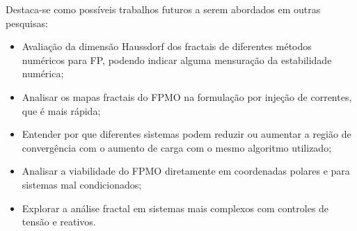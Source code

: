 Destaca-se como possíveis trabalhos futuros a serem abordados em outras pesquisas:\vspace{-1em}
\begin{itemize}
    \item Avaliação da dimensão Haussdorf dos fractais de diferentes métodos numéricos para \ac{FP}, podendo indicar alguma mensuração da estabilidade numérica;
    \item Analisar os mapas fractais do \ac{FPMO} na formulação por injeção de correntes, que é mais rápida;
    \item Entender por que diferentes sistemas podem reduzir ou aumentar a região de convergência com o aumento de carga com o mesmo algoritmo utilizado;
    \item Analisar a viabilidade do \ac{FPMO} diretamente em coordenadas polares e para sistemas mal condicionados;
    \item Explorar a análise fractal em sistemas mais complexos com controles de tensão e reativos.
\end{itemize}